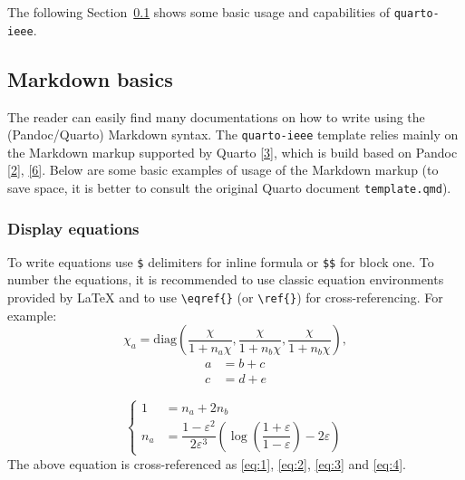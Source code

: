 \documentclass[
  journal,
]{IEEEtran}%
\theoremstyle{plain}
\theoremstyle{remark}
\begin{document}
The following Section~\ref{sec-Markdown} shows some basic usage and
capabilities of \texttt{quarto-ieee}.

\hypertarget{sec-Markdown}{%
\subsection{Markdown basics}\label{sec-Markdown}}

The reader can easily find many documentations on how to write using the
(Pandoc/Quarto) Markdown syntax. The \texttt{quarto-ieee} template
relies mainly on the Markdown markup supported by Quarto
\protect\hyperlink{ref-quarto-markdown}{{[}3{]}}, which is build based
on Pandoc \protect\hyperlink{ref-Allaire_Quarto_2022}{{[}2{]}},
\protect\hyperlink{ref-MacFarlane_Pandoc}{{[}6{]}}. Below are some basic
examples of usage of the Markdown markup (to save space, it is better to
consult the original Quarto document \texttt{template.qmd}).

\hypertarget{display-equations}{%
\subsubsection{Display equations}\label{display-equations}}

To write equations use \texttt{\$} delimiters for inline formula or
\texttt{\$\$} for block one. To number the equations, it is recommended
to use classic equation environments provided by {\LaTeX} and to use
\texttt{\textbackslash{}eqref\{\}} (or \texttt{\textbackslash{}ref\{\}})
for cross-referencing. For example: \begin{equation}\label{eq:1}
{{\chi}_a}=\text{diag}\left(\frac{{\chi}}{1+n_a{\chi}},\frac{{\chi}}{1+n_b{\chi}},\frac{{\chi}}{1+n_b{\chi}}\right),
\end{equation} \begin{align}
a & = b + c \label{eq:2} \\
c & = d + e \label{eq:3}
\end{align}

\begin{equation}\label{eq:4}
\begin{cases}
    1&=n_a+2n_b \\
    n_a&=\dfrac{1-{\varepsilon}^2}{2{\varepsilon}^3}\left(\log\left(\dfrac{1+{\varepsilon}}{1-{\varepsilon}}\right)-2{\varepsilon}\right)
\end{cases}
\end{equation} The above equation is cross-referenced as \eqref{eq:1},
\eqref{eq:2}, \eqref{eq:3} and \eqref{eq:4}.
\end{document}
